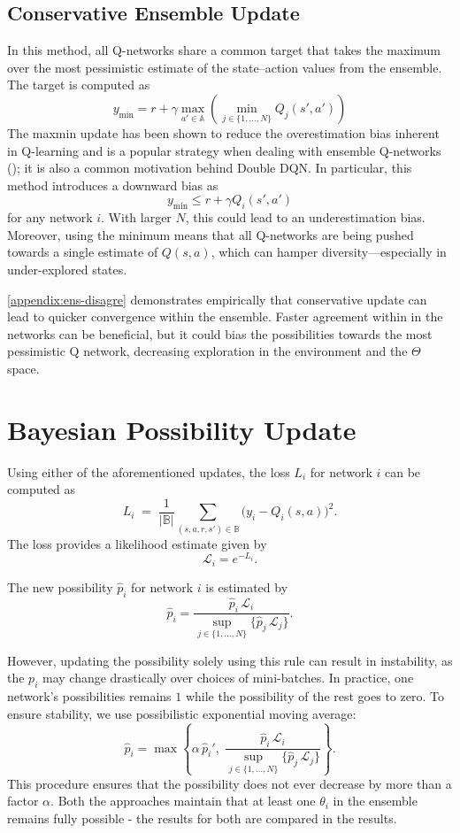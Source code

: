 \documentclass[11pt,a4paper]{report}
\begin{document}
\subsection{Conservative Ensemble Update}
In this method, all Q-networks share a common target that takes the maximum over the most pessimistic estimate of the state–action values from the ensemble. The target is computed as
\[
  y_{\min} = r + \gamma \max_{a' \in \mathbb{A}} \left( \min_{j \in \{1, \dots, N\}} Q_j(s', a') \right)
\]
The maxmin update has been shown to reduce the overestimation bias inherent in Q-learning and is a popular strategy when dealing with ensemble Q-networks (\cite{lan2021maxminq}); it is also a common motivation behind Double DQN. In particular, this method introduces a downward bias as
\[
  y_{\min} \le r + \gamma Q_i(s', a')
\]
for any network \(i\). With larger \(N\), this could lead to an underestimation bias. Moreover, using the minimum means that all Q-networks are being pushed towards a single estimate of \(Q(s,a)\), which can hamper diversity—especially in under-explored states.
\par
\ref{appendix:ens-disagre} demonstrates empirically that conservative update can lead to quicker convergence within the ensemble. Faster agreement within in the networks can be beneficial, but it could bias the possibilities towards the most pessimistic Q network, decreasing exploration in the environment and the $\Theta$ space.

\section{Bayesian Possibility Update}
Using either of the aforementioned updates, the loss \(L_i\) for network \(i\) can be computed as 
\[
L_i \;=\;\frac{1}{|\mathbb{B}|}\sum_{(s,a,r,s')\in\mathbb{B}}
\bigl(y_i - Q_i(s,a)\bigr)^{2}.
\] 
The loss provides a likelihood estimate given by
\[
  \mathcal{L}_i = e^{-L_i}.
\]


The new possibility \(\hat{p}_i\) for network \(i\) is estimated by
\[
  \hat{p}_i = \frac{\hat{p}_i \, \mathcal{L}_i}{\sup_{j \in \{1, \dots, N\}} \{\hat{p}_j \, \mathcal{L}_j\}}.
\]

However, updating the possibility solely using this rule can result in instability, as the \(p_i\) may change drastically over choices of mini-batches. In practice, one network's possibilities remains $1$ while the possibility of the rest goes to zero. To ensure stability, we use possibilistic exponential moving average:
\[
  \hat{p}_i = \max \left\{ \alpha\, \hat{p}_i', \; \frac{\hat{p}_i \, \mathcal{L}_i}{\sup_{j \in \{1, \dots, N\}} \{\hat{p}_j \, \mathcal{L}_j\}} \right\}.
\]
This procedure ensures that the possibility does not ever decrease by more than a factor $\alpha$. Both the approaches maintain that at least one $\theta_i$ in the ensemble remains fully possible - the results for both are compared in the results.   
\end{document}
